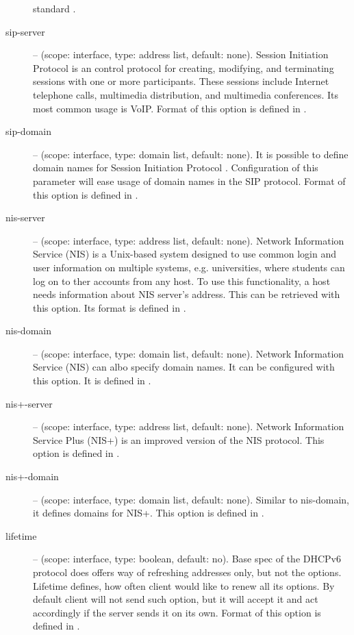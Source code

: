 \begin{description}
	    standard \cite{rfc4075}.
 \item[sip-server] -- (scope: interface, type: address list, default:
	    none). Session Initiation Protocol \cite{rfc3263} is an
	    control protocol for creating, modifying, and terminating
	    sessions with one or more participants. These sessions
	    include Internet telephone calls, multimedia distribution,
	    and multimedia conferences. Its most common usage is
	    VoIP. Format of this option is defined in \cite{rfc3319}.
 \item[sip-domain] -- (scope: interface, type: domain list, default:
	    none). It is possible to define domain names for Session
	    Initiation Protocol \cite{rfc3263}. Configuration of this
	    parameter will ease usage of domain names in the SIP
	    protocol. Format of this option is defined in
	    \cite{rfc3319}.
 \item[nis-server] -- (scope: interface, type: address list, default:
	    none). Network Information Service (NIS) is a Unix-based
	    system designed to use common login and user information on
	    multiple systems, e.g. universities, where students can log
	    on to ther accounts from any host. To use this
	    functionality, a host needs information about NIS server's
	    address. This can be retrieved with this option. Its format
	    is defined in \cite{rfc3898}.
 \item[nis-domain] -- (scope: interface, type: domain list, default:
	    none). Network Information Service (NIS) can albo specify
	    domain names. It can be configured with this option. It is
	    defined in \cite{rfc3898}.
 \item[nis+-server] -- (scope: interface, type: address list, default:
	    none). Network Information Service Plus (NIS+) is an
	    improved version of the NIS protocol. This option is defined
	    in \cite{rfc3898}.
 \item[nis+-domain] -- (scope: interface, type: domain list, default:
	    none). Similar to nis-domain, it defines domains for
	    NIS+. This option is defined in \cite{rfc3898}.
 \item[lifetime] -- (scope: interface, type: boolean, default: no). Base
	    spec of the DHCPv6 protocol does offers way of refreshing
	    addresses only, but not the options. Lifetime defines, how
	    often client would like to renew all its options. By default
	    client will not send such option, but it will accept it and
	    act accordingly if the server sends it on its own. Format of
	    this option is defined in \cite{draft-lifetime}.

\end{description}
